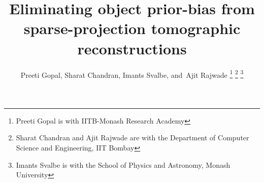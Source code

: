 \documentclass[journal]{IEEEtran}
\begin{document}
%
\title{Eliminating object prior-bias from sparse-projection tomographic reconstructions}
%
%
%

\author{Preeti Gopal,
  Sharat Chandran,
  Imants Svalbe,
        and~Ajit Rajwade
\thanks{Preeti Gopal is with IITB-Monash Research Academy}
\thanks{Sharat Chandran and Ajit Rajwade are with the Department of Computer Science and Engineering, IIT Bombay}
\thanks{Imants Svalbe is with the School of Physics and Astronomy, Monash University}}



\maketitle
\end{document}
